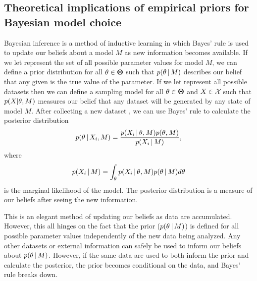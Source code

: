 \subsection*{Theoretical implications of empirical priors for Bayesian model
choice}
\begin{linenomath}
Bayesian inference is a method of inductive learning in which Bayes' rule is
used to update our beliefs about a model $M$ as new information becomes
available.
If we let \allParameterValues represent the set of all possible parameter
values for model $M$, we can define a prior distribution for all $\theta \in
\boldsymbol{\Theta}$ such that $p(\theta \,|\, M)$ describes our belief that
any given \myTheta{} is the true value of the parameter.
If we let \allDatasets represent all possible datasets then we can 
define a sampling model for all $\theta \in
\boldsymbol{\Theta}$ and $\alignment{}{} \in \allDatasets$ such that
$p(\alignment{}{} | \theta, M)$ measures our belief that any dataset \alignment{}{}
will be generated by any state \myTheta{} of model $M$.
After collecting a new dataset , we can use Bayes' rule to
calculate the posterior distribution
\begin{equation}
    p(\myTheta{} \given \alignment{i}{}, M) = \frac{p(\alignment{i}{} \given
    \myTheta{}, M)p(\myTheta{}, M)}{p(\alignment{i}{} \given M)},
    \label{eq:bayesrule}
\end{equation}
where
\begin{equation}
    p(\alignment{i}{} \given M) = \int_{\myTheta{}} p(\alignment{i}{} \given
    \myTheta{}, M)p(\myTheta{} \given M) d\myTheta{}
    \label{eq:marginallikelhiood}
\end{equation}
is the marginal likelihood of the model.
The posterior distribution is a measure of our beliefs after seeing the new
information.
\end{linenomath}

This is an elegant method of updating our beliefs as data are accumulated.
However, this all hinges on the fact that the prior ($p(\theta_{} \,|\, M)$)
is defined for all possible parameter values independently of the new data
being analyzed.
Any other datasets or external information can safely be used to inform our
beliefs about $p(\theta_{} \,|\, M)$.
However, if the same data are used to both inform the prior and calculate the
posterior, the prior becomes conditional on the data, and Bayes' rule breaks
down.


